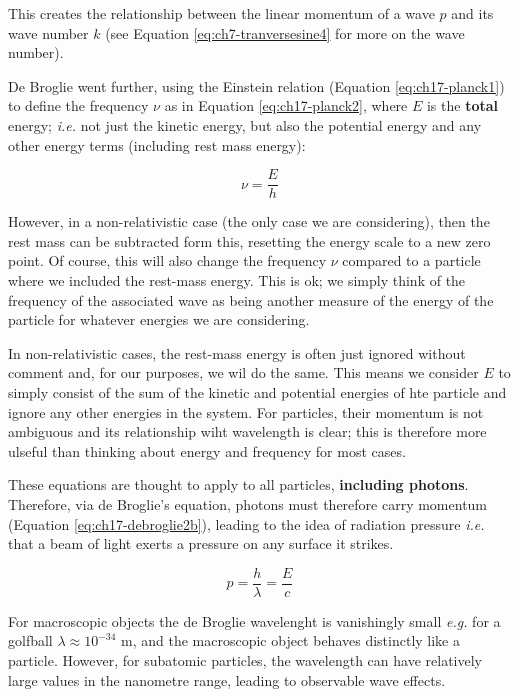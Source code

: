 \documentclass[
]{book}
\begin{document}
This creates the relationship between the linear momentum of a wave \(p\) and its wave number \(k\) (see Equation \eqref{eq:ch7-tranversesine4} for more on the wave number).

De Broglie went further, using the Einstein relation (Equation \eqref{eq:ch17-planck1}) to define the frequency \(\nu\) as in Equation \eqref{eq:ch17-planck2}, where \(E\) is the \textbf{total} energy; \emph{i.e.} not just the kinetic energy, but also the potential energy and any other energy terms (including rest mass energy):

\begin{equation}
\nu = \frac{E}{h}
\label{eq:ch17-planck2}
\end{equation}

However, in a non-relativistic case (the only case we are considering), then the rest mass can be subtracted form this, resetting the energy scale to a new zero point. Of course, this will also change the frequency \(\nu\) compared to a particle where we included the rest-mass energy. This is ok; we simply think of the frequency of the associated wave as being another measure of the energy of the particle for whatever energies we are considering.

In non-relativistic cases, the rest-mass energy is often just ignored without comment and, for our purposes, we wil do the same. This means we consider \(E\) to simply consist of the sum of the kinetic and potential energies of hte particle and ignore any other energies in the system. For particles, their momentum is not ambiguous and its relationship wiht wavelength is clear; this is therefore more ulseful than thinking about energy and frequency for most cases.

These equations are thought to apply to all particles, \textbf{including photons}. Therefore, via de Broglie's equation, photons must therefore carry momentum (Equation \eqref{eq:ch17-debroglie2b}), leading to the idea of radiation pressure \emph{i.e.} that a beam of light exerts a pressure on any surface it strikes.

\begin{equation}
p = \frac{h}{\lambda} = \frac{E}{c}
\label{eq:ch17-debroglie2b}
\end{equation}

For macroscopic objects the de Broglie wavelenght is vanishingly small \emph{e.g.} for a golfball \(\lambda \approx 10^{-34}\) m, and the macroscopic object behaves distinctly like a particle. However, for subatomic particles, the wavelength can have relatively large values in the nanometre range, leading to observable wave effects.
\end{document}
